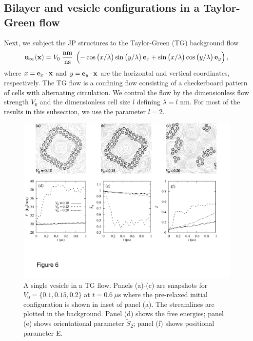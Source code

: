 \documentclass[prb,preprint,showpacs,preprintnumbers,amsmath,amssymb,longbibliography]{revtex4-1}
\newcommand{\xx}{\mathbf{x}}
\newcommand{\uu}{\mathbf{u}}
\begin{document}
\subsection{Bilayer and vesicle configurations in a Taylor-Green flow}
Next, we subject the JP structures to the Taylor-Green (TG) background
flow
\begin{equation}
\label{eq:tg_flow}
\uu_\infty(\xx) = V_0\; \frac{\text{nm}}{\text{ns}}\;
\left(
-\cos\left(x/\lambda\right)
 \sin\left(y/\lambda\right)
         {\bf e}_x
         +\sin\left(x/\lambda\right)
         \cos\left(y/\lambda\right)
             {\bf e}_y\right),
\end{equation}
where $x = {\bf e}_x \cdot \xx$ and $y = {\bf e}_y \cdot \xx$
are the horizontal and vertical coordinates, respectively. 
The TG flow is a confining flow consisting of a checkerboard pattern
of cells with alternating circulation. We control the flow by the
dimensionless flow strength $V_0$ and the dimensionless cell size $l$
defining $\lambda = l$ nm. For most of the results in this subsection,
we use the parameter $l=2$.
%

\begin{figure}
  \begin{center}
    \includegraphics[width=1.0\textwidth]{Figures/Figure6.pdf}        
  \end{center}
\caption{\label{fig:ves_TG} A single vesicle in a TG flow. Panels
  (a)-(c) are snapshots for $V_0=\{0.1, 0.15, 0.2\}$ at $t=0.6\ \mu$s
  where the pre-relaxed initial configuration is shown in inset of panel
  (a). The streamlines are plotted in the background. Panel (d) shows
  the free energies; panel (e) shows orientational parameter
  $\tilde{S}_2$; panel (f) shows positional parameter E.}
\end{figure}
\end{document}

